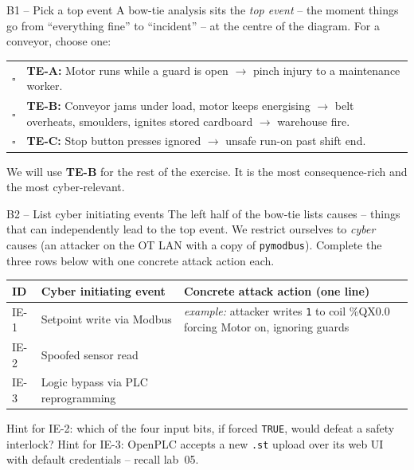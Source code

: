 \documentclass[11pt,a4paper]{article}
\begin{document}
\begin{stepbox}{B1 -- Pick a top event}
A bow-tie analysis sits the \emph{top event} -- the moment things go from ``everything fine'' to ``incident'' -- at the centre of the diagram. For a conveyor, choose one:

\medskip
\begin{tabular}{p{8mm}p{145mm}}
$\square$ & \textbf{TE-A:} Motor runs while a guard is open $\rightarrow$ pinch injury to a maintenance worker. \\
$\square$ & \textbf{TE-B:} Conveyor jams under load, motor keeps energising $\rightarrow$ belt overheats, smoulders, ignites stored cardboard $\rightarrow$ warehouse fire. \\
$\square$ & \textbf{TE-C:} Stop button presses ignored $\rightarrow$ unsafe run-on past shift end. \\
\end{tabular}

\medskip\noindent
We will use \textbf{TE-B} for the rest of the exercise. It is the most consequence-rich and the most cyber-relevant.
\end{stepbox}

\begin{stepbox}{B2 -- List cyber initiating events}
The left half of the bow-tie lists causes -- things that can independently lead to the top event. We restrict ourselves to \emph{cyber} causes (an attacker on the OT LAN with a copy of \texttt{pymodbus}). Complete the three rows below with one concrete attack action each.

\medskip
\renewcommand{\arraystretch}{1.3}
\begin{tabular}{|p{16mm}|p{40mm}|p{90mm}|}
\hline
\textbf{ID} & \textbf{Cyber initiating event} & \textbf{Concrete attack action (one line)} \\
\hline
IE-1 & Setpoint write via Modbus & \emph{example:} attacker writes \texttt{1} to coil \%QX0.0 forcing Motor on, ignoring guards \\
\hline
IE-2 & Spoofed sensor read & \\
\hline
IE-3 & Logic bypass via PLC reprogramming & \\
\hline
\end{tabular}

\medskip\noindent
Hint for IE-2: which of the four input bits, if forced \texttt{TRUE}, would defeat a safety interlock? Hint for IE-3: OpenPLC accepts a new \texttt{.st} upload over its web UI with default credentials -- recall lab~05.
\end{stepbox}
\end{document}
